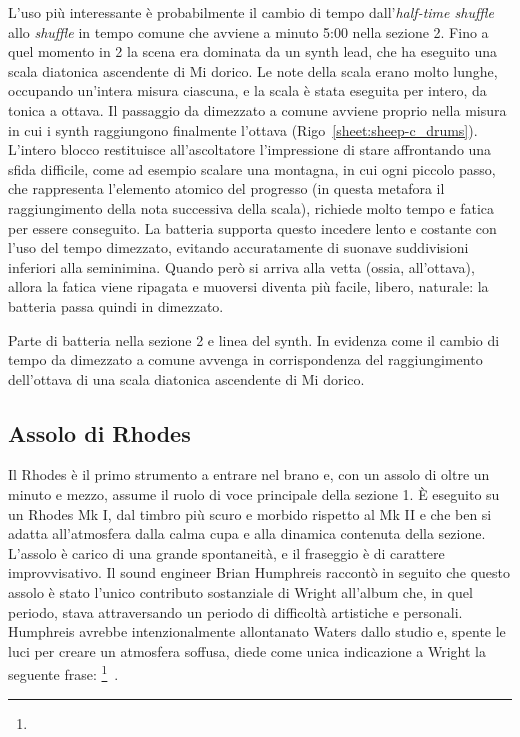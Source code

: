 \documentclass[class=book, crop=false, oneside, 12pt]{standalone}
\begin{document}
    L'uso più interessante è probabilmente il cambio di tempo dall'\emph{half-time shuffle} allo \emph{shuffle} in tempo comune che avviene a minuto 5:00 nella sezione 2. Fino a quel momento in 2 la scena era dominata da un synth lead, che ha eseguito una scala diatonica ascendente di Mi dorico. Le note della scala erano molto lunghe, occupando un'intera misura ciascuna, e la scala è stata eseguita per intero, da tonica a ottava. Il passaggio da dimezzato a comune avviene proprio nella misura in cui i synth raggiungono finalmente l'ottava (Rigo~\ref{sheet:sheep-c_drums}). L'intero blocco restituisce all'ascoltatore l'impressione di stare affrontando una sfida difficile, come ad esempio scalare una montagna, in cui ogni piccolo passo, che rappresenta l'elemento atomico del progresso (in questa metafora il raggiungimento della nota successiva della scala), richiede  molto tempo e fatica per essere conseguito. La batteria supporta questo incedere lento e costante con l'uso del tempo dimezzato, evitando accuratamente di suonave suddivisioni inferiori alla seminimina. Quando però si arriva alla vetta (ossia, all'ottava), allora la fatica viene ripagata e muoversi diventa più facile, libero, naturale: la batteria passa quindi in dimezzato. 
    
    \begin{sheet}[htb]
        \centering
        \caption[Parte di batteria nella sezione 2 e linea del synth.]{Parte di batteria nella sezione 2 e linea del synth. In evidenza come il cambio di tempo da dimezzato a comune  avvenga in corrispondenza del raggiungimento dell'ottava di una scala diatonica ascendente di Mi dorico.}
        \label{sheet:sheep-c_drums}
    \end{sheet}


    \subsection{Assolo di Rhodes}
    Il Rhodes è il primo strumento a entrare nel brano e, con un assolo di oltre un minuto e mezzo, assume il ruolo di voce principale della sezione 1. È eseguito su un Rhodes Mk I, dal timbro più scuro e morbido rispetto al Mk II e che ben si adatta all'atmosfera dalla calma cupa e alla dinamica contenuta della sezione. L'assolo è carico di una grande spontaneità, e il fraseggio è di carattere improvvisativo. Il sound engineer Brian Humphreis raccontò in seguito che questo assolo è stato l'unico contributo sostanziale di Wright all'album che, in quel periodo, stava attraversando un periodo di difficoltà artistiche e personali. Humphreis avrebbe intenzionalmente allontanato Waters dallo studio e,   spente le luci per creare un atmosfera soffusa, diede come unica indicazione a Wright la seguente frase: \footnote{}~\cite{easlea2022raving}.
\end{document}
